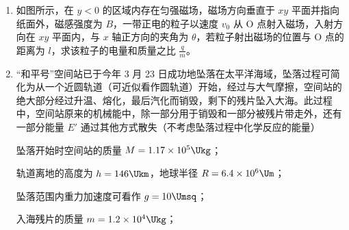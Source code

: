 \documentclass[\gkver]{gaokaozhenti}
\begin{document}
\begin{enumerate}
{评分标准：本题 12 分。①式 8 分，②式 4 分。
}

\item
如图所示，在 $y < 0$ 的区域内存在匀强磁场，磁场方向垂直于 $xy$ 平面并指向纸面外，磁感强度为 $B$，一带正电的粒子以速度 $v_{0}$ 从 O 点射入磁场，入射方向在 $xy$ 平面内，与 $x$ 轴正方向的夹角为 $\theta$，若粒子射出磁场的位置与 O 点的距离为 $l$，求该粒子的电量和质量之比 $\frac{q}{m}$。



\item
“和平号”空间站已于今年 3 月 23 日成功地坠落在太平洋海域，坠落过程可简化为从一个近圆轨道（可近似看作圆轨道）开始，经过与大气摩擦，空间站的绝大部分经过升温、熔化，最后汽化而销毁，剩下的残片坠入大海。此过程中，空间站原来的机械能中，除一部分用于销毁和一部分被残片带走外，还有一部分能量 $E'$ 通过其他方式散失（不考虑坠落过程中化学反应的能量）

坠落开始时空间站的质量 $M = 1.17\times10^{5}\Ukg$；

轨道离地的高度为 $h = 146\Ukm$，地球半径 $R = 6.4\times10^{6}\Um$；

坠落范围内重力加速度可看作 $g = 10\Umsq$；

入海残片的质量 $m = 1.2\times10^{4}\Ukg$；


\end{enumerate}
\end{document}
